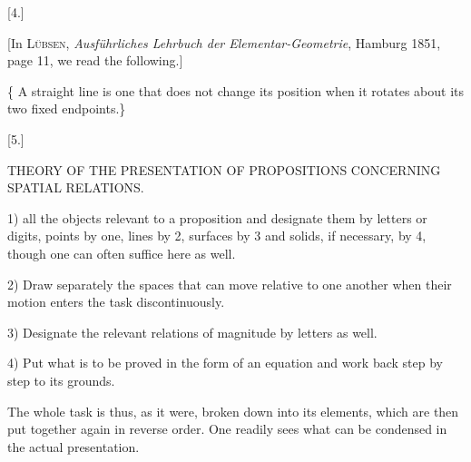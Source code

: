 \begin{center}
[4.]
\end{center}

[In \textsc{Lübsen}, \emph{Ausf\"uhrliches Lehrbuch der Elementar-Geometrie}, Hamburg 1851, page 11, we read the following.]

\{ A straight line is one that does not change its position when it rotates about its two fixed endpoints.\}



\begin{center}
[5.]

\textnormal{THEORY OF THE PRESENTATION OF PROPOSITIONS CONCERNING SPATIAL RELATIONS.}
\end{center}

1)  all the objects relevant to a proposition and designate them by letters or digits, points by one, lines by 2, surfaces by 3 and solids, if necessary, by 4, though one can often suffice here as well.

2) Draw separately the spaces that can move relative to one another when their motion enters the task discontinuously.

3) Designate the relevant relations of magnitude by letters as well.

4) Put what is to be proved in the form of an equation and work back step by step to its grounds.

The whole task is thus, as it were, broken down into its elements, which are then put together again in reverse order. One readily sees what can be condensed in the actual presentation.

